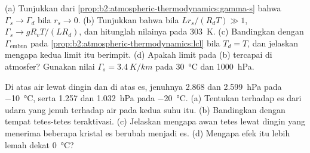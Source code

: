 \begin{exercise}[$\star\star\star$]\label{exo:b2:atmospheric-thermodynamics:11}
(a) Tunjukkan dari \cref{prop:b2:atmospheric-thermodynamics:gamma-s} bahwa $\Gamma_s \to \Gamma_d$
bila $r_s \to 0$. (b) Tunjukkan bahwa bila $Lr_s/(R_dT) \gg 1$, $\Gamma_s \to gR_vT/(LR_d)$, dan
hitunglah nilainya pada \qty{303}{K}. (c) Bandingkan dengan $\Gamma_{\text{embun}}$ pada
\cref{prop:b2:atmospheric-thermodynamics:lcl} bila $T_d = T$, dan jelaskan mengapa kedua limit itu
berimpit. (d) Apakah limit pada (b) tercapai di atmosfer? Gunakan nilai $\Gamma_s =
\qty{3.4}{K/km}$ pada \qty{30}{\celsius} dan \qty{1000}{hPa}.
\end{exercise}

\begin{exercise}[$\star\star\star$]\label{exo:b2:atmospheric-thermodynamics:12}
Di atas air lewat dingin dan di atas es,  jenuhnya 2.868 dan
\qty{2.599}{hPa} pada \qty{-10}{\celsius}, serta 1.257 dan \qty{1.032}{hPa} pada \qty{-20}{\celsius}.
(a) Tentukan  terhadap es dari udara yang jenuh terhadap air pada kedua suhu itu. (b)
Bandingkan dengan  tempat tetes-tetes teraktivasi. (c) Jelaskan mengapa awan tetes
lewat dingin yang menerima beberapa kristal es berubah menjadi es. (d) Mengapa efek itu
lebih lemah dekat \qty{0}{\celsius}?
\end{exercise}


